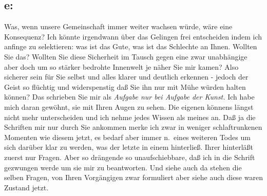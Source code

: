 \documentclass[
]{article}
\author{}
\date{\vspace{-2.5em}}
\begin{document}
\subsection{e:}\label{e}

Was, wenn unsere Gemeinschaft immer weiter wachsen würde, wäre eine
Konsequenz? Ich könnte irgendwann über das Gelingen frei entscheiden
indem ich anfinge zu selektieren: was ist das Gute, was ist das
Schlechte an Ihnen. Wollten Sie das? Wollten Sie diese Sicherheit im
Tausch gegen eine zwar unabhängige aber doch um so stärker bedrohte
Innenwelt je näher Sie mir kamen? Also sicherer sein für Sie selbst und
alles klarer und deutlich erkennen - jedoch der Geist so flüchtig und
widerspenstig daß Sie ihn nur mit Mühe würden halten können? Das
schrieben Sie mir als \emph{Aufgabe nur bei Aufgabe der Kunst. }Ich habe
mich daran gewöhnt, sie mit Ihren Augen zu sehen. Die eigenen könnens
längst nicht mehr unterscheiden und ich nehme jedes Wissen als meines
an. Daß ja die Schriften mir nur durch Sie ankommen merke ich zwar in
weniger schlaftrunkenen Momenten wie diesem jetzt, es bedarf aber immer
n.~eines weiteren Todes um sich darüber klar zu werden, was der letzte
in einem hinterließ. Ihrer hinterläßt zuerst nur Fragen. Aber so
drängende so unaufschiebbare, daß ich in die Schrift gezwungen werde um
sie mir zu beantworten. Und siehe auch da stehen die selben Fragen, von
Ihren Vorgängigen zwar formuliert aber siehe auch diese waren Zustand
jetzt.
\end{document}
